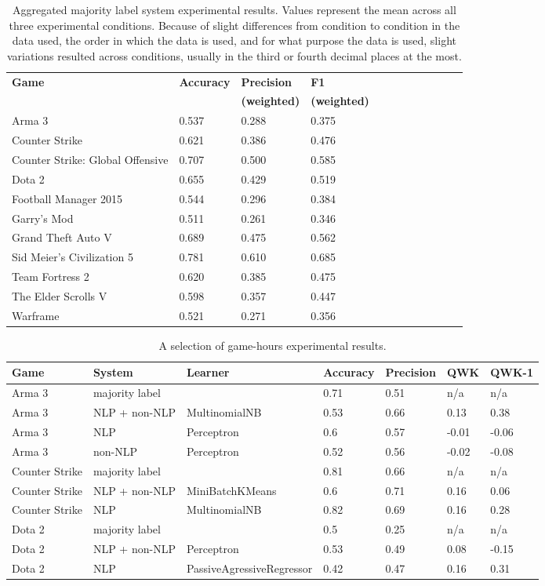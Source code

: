 \documentclass[9pt]{article}
\begin{document}
\begin{table*}[htbp]
\label{tab:majority}
\centering
\begin{tabular}{*{12}{l}}
\hline \bf Game & \bf Accuracy & \bf Precision & \bf F1 \\
& & \bf (weighted) & \bf (weighted) \\ \hline
Arma 3 & 0.537 & 0.288 & 0.375 \\
Counter Strike & 0.621 & 0.386 & 0.476 \\
Counter Strike: Global Offensive & 0.707 & 0.500 & 0.585 \\
Dota 2 & 0.655 & 0.429 & 0.519 \\
Football Manager 2015 & 0.544 & 0.296 & 0.384 \\
Garry's Mod & 0.511 & 0.261 & 0.346 \\
Grand Theft Auto V & 0.689 & 0.475 & 0.562 \\
Sid Meier's Civilization 5 & 0.781 & 0.610 & 0.685 \\
Team Fortress 2 & 0.620 & 0.385 & 0.475 \\
The Elder Scrolls V & 0.598 & 0.357 & 0.447 \\
Warframe & 0.521 & 0.271 & 0.356 \\ \hline
\end{tabular}
\caption{Aggregated majority label system experimental results. Values represent the mean across all three experimental conditions. Because of slight differences from condition to condition in the data used, the order in which the data is used, and for what purpose the data is used, slight variations resulted across conditions, usually in the third or fourth decimal places at the most.}
\end{table*}

\begin{table*}[htbp]
\label{tab:gamehours}
\centering
\begin{tabular}{*{7}{l}}
\hline \bf Game & \bf System & \bf Learner & \bf Accuracy & \bf Precision & \bf QWK & \bf QWK-1 \\ \hline
Arma 3 & majority label &  & 0.71 & 0.51 & n/a & n/a \\
Arma 3 & NLP + non-NLP & MultinomialNB & 0.53 & 0.66 & 0.13 & 0.38 \\
Arma 3 & NLP & Perceptron & 0.6 & 0.57 & -0.01 & -0.06 \\
Arma 3 & non-NLP & Perceptron & 0.52 & 0.56 & -0.02 & -0.08 \\
Counter Strike & majority label &  & 0.81 & 0.66 & n/a & n/a \\
Counter Strike & NLP + non-NLP & MiniBatchKMeans & 0.6 & 0.71 & 0.16 & 0.06 \\
Counter Strike & NLP & MultinomialNB & 0.82 & 0.69 & 0.16 & 0.28 \\
Dota 2 & majority label &  & 0.5 & 0.25 & n/a & n/a \\
Dota 2 & NLP + non-NLP & Perceptron & 0.53 & 0.49 & 0.08 & -0.15 \\
Dota 2 & NLP & PassiveAgressiveRegressor & 0.42 & 0.47 & 0.16 & 0.31 \\ \hline
\end{tabular}
\caption{A selection of game-hours experimental results.}
\end{table*}
\end{document}
